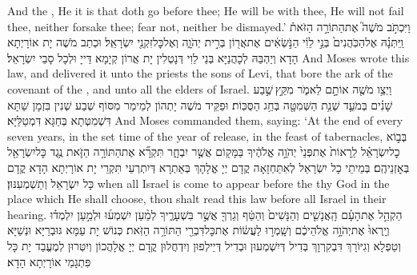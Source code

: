 {And the \lord, He it is that doth go before thee; He will be with thee, He will not fail thee, neither forsake thee; fear not, neither be dismayed.’}{}
{וַיִּכְתֹּ֣ב מֹשֶׁה֮ אֶת\maqqaf הַתּוֹרָ֣ה הַזֹּאת֒ וַֽיִּתְּנָ֗הּ אֶל\maqqaf הַכֹּֽהֲנִים֙ בְּנֵ֣י לֵוִ֔י הַנֹּ֣שְׂאִ֔ים אֶת\maqqaf אֲר֖וֹן בְּרִ֣ית יְהֹוָ֑ה וְאֶל\maqqaf כׇּל\maqqaf זִקְנֵ֖י יִשְׂרָאֵֽל׃}
{וּכְתַב מֹשֶׁה יָת אוֹרָיְתָא הָדָא וְיַהְבַּהּ לְכָהֲנַיָּא בְּנֵי לֵוִי דְּנָטְלִין יָת אֲרוֹן קְיָמָא דַּייָ וּלְכָל סָבֵי יִשְׂרָאֵל׃}
{And Moses wrote this law, and delivered it unto the priests the sons of Levi, that bore the ark of the covenant of the \lord, and unto all the elders of Israel.}{}
{וַיְצַ֥ו מֹשֶׁ֖ה אוֹתָ֣ם לֵאמֹ֑ר מִקֵּ֣ץ \legarmeh  שֶׁ֣בַע שָׁנִ֗ים בְּמֹעֵ֛ד שְׁנַ֥ת הַשְּׁמִטָּ֖ה בְּחַ֥ג הַסֻּכּֽוֹת׃}
{וּפַקֵּיד מֹשֶׁה יָתְהוֹן לְמֵימַר מִסּוֹף שְׁבַע שְׁנִין בִּזְמָן שַׁתָּא דִּשְׁמִטְּתָא בְּחַגָּא דִּמְטַלַּיָּא׃}
{And Moses commanded them, saying: ‘At the end of every seven years, in the set time of the year of release, in the feast of tabernacles,}{}
{בְּב֣וֹא כׇל\maqqaf יִשְׂרָאֵ֗ל לֵֽרָאוֹת֙ אֶת\maqqaf פְּנֵי֙ יְהֹוָ֣ה אֱלֹהֶ֔יךָ בַּמָּק֖וֹם אֲשֶׁ֣ר יִבְחָ֑ר תִּקְרָ֞א אֶת\maqqaf הַתּוֹרָ֥ה הַזֹּ֛את נֶ֥גֶד כׇּל\maqqaf יִשְׂרָאֵ֖ל בְּאׇזְנֵיהֶֽם׃}
{בְּמֵיתֵי כָל יִשְׂרָאֵל לְאִתַּחְזָאָה קֳדָם יְיָ אֱלָהָךְ בְּאַתְרָא דְּיִתְרְעֵי תִּקְרֵי יָת אוֹרָיְתָא הָדָא קֳדָם כָּל יִשְׂרָאֵל וְתַשְׁמְעִנּוּן׃}
{when all Israel is come to appear before the \lord\space thy God in the place which He shall choose, thou shalt read this law before all Israel in their hearing.}{}
{הַקְהֵ֣ל אֶת\maqqaf הָעָ֗ם הָֽאֲנָשִׁ֤ים וְהַנָּשִׁים֙ וְהַטַּ֔ף וְגֵרְךָ֖ אֲשֶׁ֣ר בִּשְׁעָרֶ֑יךָ לְמַ֨עַן יִשְׁמְע֜וּ וּלְמַ֣עַן יִלְמְד֗וּ וְיָֽרְאוּ֙ אֶת\maqqaf יְהֹוָ֣ה אֱלֹהֵיכֶ֔ם וְשָֽׁמְר֣וּ לַעֲשׂ֔וֹת אֶת\maqqaf כׇּל\maqqaf דִּבְרֵ֖י הַתּוֹרָ֥ה הַזֹּֽאת׃}
{כְּנוֹשׁ יָת עַמָּא גּוּבְרַיָּא וּנְשַׁיָּא וְטַפְלָא וְגִיּוֹרָךְ דִּבְקִרְוָךְ בְּדִיל דְּיִשְׁמְעוּן וּבְדִיל דְּיֵילְפוּן וְיִדְחֲלוּן קֳדָם יְיָ אֱלָהֲכוֹן וְיִטְּרוּן לְמֶעֱבַד יָת כָּל פִּתְגָמֵי אוֹרָיְתָא הָדָא׃}
